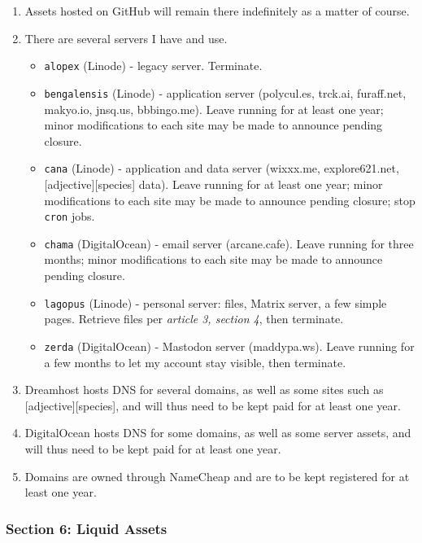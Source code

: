 \begin{enumerate}
\def\labelenumi{\arabic{enumi}.}
\tightlist
\item
  Assets hosted on GitHub will remain there indefinitely as a matter of course.
\item
  There are several servers I have and use.

  \begin{itemize}
  \tightlist
  \item
    \texttt{alopex} (Linode) - legacy server. Terminate.
  \item
    \texttt{bengalensis} (Linode) - application server (polycul.es, trck.ai, furaff.net, makyo.io, jnsq.us, bbbingo.me). Leave running for at least one year; minor modifications to each site may be made to announce pending closure.
  \item
    \texttt{cana} (Linode) - application and data server (wixxx.me, explore621.net, {[}adjective{]}{[}species{]} data). Leave running for at least one year; minor modifications to each site may be made to announce pending closure; stop \texttt{cron} jobs.
  \item
    \texttt{chama} (DigitalOcean) - email server (arcane.cafe). Leave running for three months; minor modifications to each site may be made to announce pending closure.
  \item
    \texttt{lagopus} (Linode) - personal server: files, Matrix server, a few simple pages. Retrieve files per \emph{article 3, section 4}, then terminate.
  \item
    \texttt{zerda} (DigitalOcean) - Mastodon server (maddypa.ws). Leave running for a few months to let my account stay visible, then terminate.
  \end{itemize}
\item
  Dreamhost hosts DNS for several domains, as well as some sites such as {[}adjective{]}{[}species{]}, and will thus need to be kept paid for at least one year.
\item
  DigitalOcean hosts DNS for some domains, as well as some server assets, and will thus need to be kept paid for at least one year.
\item
  Domains are owned through NameCheap and are to be kept registered for at least one year.
\end{enumerate}

\hypertarget{section-6-liquid-assets}{%
\subsubsection*{Section 6: Liquid Assets}\label{section-6-liquid-assets}}

